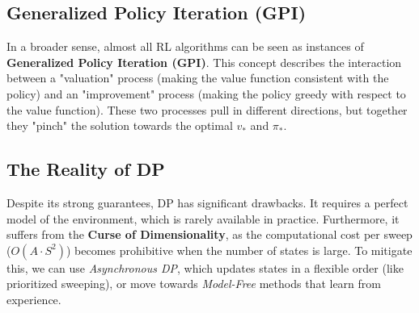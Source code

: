 \subsection{Generalized Policy Iteration (GPI)}
In a broader sense, almost all RL algorithms can be seen as instances of \textbf{Generalized Policy Iteration (GPI)}. This concept describes the interaction between a "valuation" process (making the value function consistent with the policy) and an "improvement" process (making the policy greedy with respect to the value function). These two processes pull in different directions, but together they "pinch" the solution towards the optimal $v_*$ and $\pi_*$.

\subsection{The Reality of DP}
Despite its strong guarantees, DP has significant drawbacks. It requires a perfect model of the environment, which is rarely available in practice. Furthermore, it suffers from the \textbf{Curse of Dimensionality}, as the computational cost per sweep ($O(A \cdot S^2)$) becomes prohibitive when the number of states is large. To mitigate this, we can use \textit{Asynchronous DP}, which updates states in a flexible order (like prioritized sweeping), or move towards \textit{Model-Free} methods that learn from experience.
